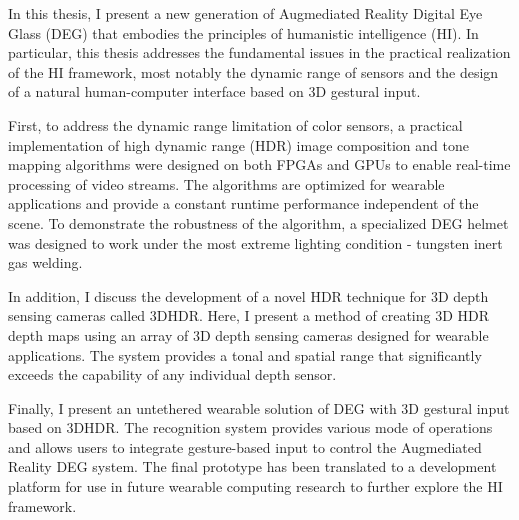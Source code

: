 In this thesis, I present a new generation of Augmediated Reality Digital Eye Glass (DEG) that embodies the principles of humanistic intelligence (HI).  In particular, this thesis addresses the fundamental issues in the practical realization of the HI framework, most notably the dynamic range of sensors and the design of a natural human-computer interface based on 3D gestural input.  

First, to address the dynamic range limitation of color sensors, a practical implementation of high dynamic range (HDR) image composition and tone mapping algorithms were designed on both FPGAs and GPUs to enable real-time processing of video streams. The algorithms are optimized for wearable applications and provide a constant runtime performance independent of the scene. To demonstrate the robustness of the algorithm, a specialized DEG helmet was designed to work under the most extreme lighting condition - tungsten inert gas welding. 

In addition, I discuss the development of a novel HDR technique for 3D depth sensing cameras called 3DHDR.  Here, I present a method of creating 3D HDR depth maps using an array of 3D depth sensing cameras designed for wearable applications. The system provides a tonal and spatial range that significantly exceeds the capability of any individual depth sensor. 
 
Finally, I present an untethered wearable solution of DEG with 3D gestural input based on 3DHDR. The recognition system provides various mode of operations and allows users to integrate gesture-based input to control the Augmediated Reality DEG system. The final prototype has been translated to a development platform for use in future wearable computing research to further explore the HI framework. 